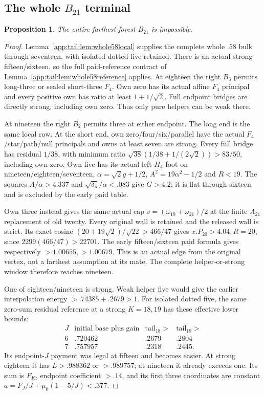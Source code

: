 \documentclass[11pt]{article}
\newtheorem{proposition}[theorem]{Proposition}
\theoremstyle{definition}
\theoremstyle{remark}
\begin{document}
\subsection[The whole B21 terminal]{The whole $B_{21}$ terminal}
\label{app:tail:wholeB21}
\begin{proposition}
\label{app:tail:prop:wholeB21}
The entire farthest forest $B_{21}$ is impossible.
\end{proposition}
\begin{proof}
Lemma~\ref{app:tail:lem:whole58local} supplies the complete whole
$.58$ bulk through seventeen, with isolated dotted five retained.
There is an actual strong fifteen/sixteen, so the full paid-reference
contract of Lemma~\ref{app:tail:lem:whole58reference} applies.
At eighteen the right $B_3$ permits long-three or sealed short-three
$F_4$. Own zero has its actual affine $F_4$ principal and every
positive own has ratio at least $1+1/\sqrt2$. Full endpoint bridges
are directly strong, including own zero. Thus only pure helpers
can be weak there.

At nineteen the right $B_2$ permits three at either endpoint.
The long end is the same local row. At the short end, own
zero/four/six/parallel have the actual $F_4$/star/path/null
principals and owns at least seven are strong. Every full bridge
has residual $1/38$, with minimum ratio
$\sqrt{38}(1/38+1/(2\sqrt2))>83/50$, including own zero.
Own five has its actual left $H_4$ foot on nineteen/eighteen/seventeen,
$\alpha=\sqrt2g+1/2$, $A^2=19\alpha^2-1/2$ and $R<19$.
The squares $A/\alpha>4.337$ and
$\sqrt{\delta_5}/\alpha<.083$ give $G>4.2$; it is flat
through sixteen and is excluded by the early paid table.

Own three instead gives the same actual cap
$v=(\omega_{19}+\omega_{21})/2$ at the finite $A_{21}$
replacement of old twenty. Every original wall is retained and
the released wall is strict. Its exact cosine
$(20+19\sqrt2)/\sqrt{22}>466/47$ gives
$x.P_{20}>4.04,R=20$, since $2299(466/47)>22701$.
The early fifteen/sixteen paid formula gives respectively
$>1.00655,>1.00679$. This is an actual edge from the original
vertex, not a farthest assumption at its mate. The complete
helper-or-strong window therefore reaches nineteen.

One of eighteen/nineteen is strong. Weak helper five would give
the earlier interpolation energy $>.74385+.2679>1$.
For isolated dotted five, the same zero-sum residual reference at
a strong $K=18,19$ has these effective lower bounds:
\[
\begin{array}{c|c|c|c}
J&\text{initial base plus gain}&\text{tail}_{18}>&\text{tail}_{19}>\\\hline
6&.720462&.2679&.2804\\7&.757957&.2318&.2445 .
\end{array}
\]
Its endpoint-$J$ payment was legal at fifteen and becomes easier.
At strong eighteen it has $L>.988362$ or $>.989757$;
at nineteen it already exceeds one. Its sum is $F_K$, endpoint
coefficient $> .14$, and its first three coordinates are constant
$a=F_J/J+\mu_0(1-5/J)<.377$.


\end{proof}
\end{document}
